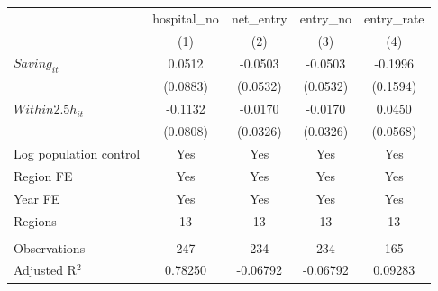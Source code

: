 \begingroup
\centering
\begin{tabular}{lcccc}
   \toprule
                          & hospital\_no  & net\_entry  & entry\_no  & entry\_rate \\    
                          & (1)           & (2)         & (3)        & (4)\\  
   \midrule 
   $Saving_{it}$          & 0.0512        & -0.0503     & -0.0503    & -0.1996\\   
                          & (0.0883)      & (0.0532)    & (0.0532)   & (0.1594)\\   
   $Within2.5h_{it}$      & -0.1132       & -0.0170     & -0.0170    & 0.0450\\   
                          & (0.0808)      & (0.0326)    & (0.0326)   & (0.0568)\\   
   Log population control & Yes           & Yes         & Yes        & Yes\\  
   Region FE              & Yes           & Yes         & Yes        & Yes\\  
   Year FE                & Yes           & Yes         & Yes        & Yes\\  
   Regions                & 13            & 13          & 13         & 13\\  
    \\
   Observations           & 247           & 234         & 234        & 165\\  
   Adjusted R$^2$         & 0.78250       & -0.06792    & -0.06792   & 0.09283\\  
   \bottomrule
\end{tabular}
\par\endgroup

